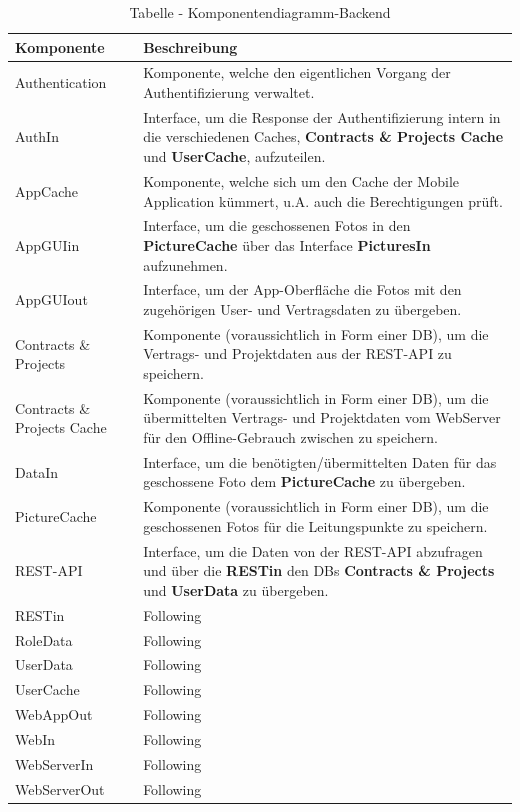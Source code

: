\begin{longtable}{|p{2.5cm}|p{10.0cm}|}
\caption{Tabelle - Komponentendiagramm-Backend}
\label{tab:table_comp_backend} \\
\hline
\textbf{Komponente} & \textbf{Beschreibung} \\ 
\hline
Authentication & Komponente, welche den eigentlichen Vorgang der Authentifizierung verwaltet. \\
\hline
AuthIn & Interface, um die Response der Authentifizierung intern in die verschiedenen Caches, \textbf{Contracts {\&} Projects Cache} und \textbf{UserCache}, aufzuteilen. \\
\hline
AppCache & Komponente, welche sich um den Cache der Mobile Application kümmert, u.A. auch die Berechtigungen prüft. \\
\hline
AppGUIin & Interface, um die geschossenen Fotos in den \textbf{PictureCache} über das Interface \textbf{PicturesIn} aufzunehmen. \\
\hline
AppGUIout & Interface, um der App-Oberfläche die Fotos mit den zugehörigen User- und Vertragsdaten zu übergeben. \\
\hline
Contracts {\&} Projects & Komponente (voraussichtlich in Form einer DB), um die Vertrags- und Projektdaten aus der REST-API zu speichern. \\
\hline
Contracts {\&} Projects Cache & Komponente (voraussichtlich in Form einer DB), um die übermittelten Vertrags- und Projektdaten vom WebServer für den Offline-Gebrauch zwischen zu speichern.\\
\hline
DataIn & Interface, um die benötigten/übermittelten Daten für das geschossene Foto dem \textbf{PictureCache} zu übergeben. \\
\hline
PictureCache & Komponente (voraussichtlich in Form einer DB), um die geschossenen Fotos für die Leitungspunkte zu speichern. \\
\hline
REST-API & Interface, um die Daten von der REST-API abzufragen und über die \textbf{RESTin} den DBs \textbf{Contracts {\&} Projects} und \textbf{UserData} zu übergeben. \\
\hline
RESTin & Following \\
\hline
RoleData & Following \\
\hline
UserData & Following \\
\hline
UserCache & Following \\
\hline
WebAppOut & Following \\
\hline
WebIn & Following \\
\hline
WebServerIn & Following \\
\hline
WebServerOut & Following \\
\hline
\end{longtable}